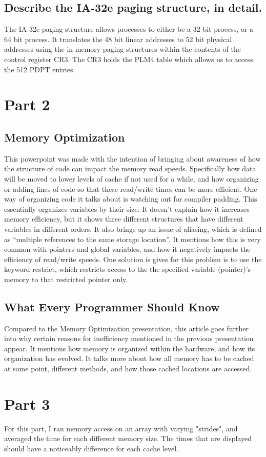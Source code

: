 \documentclass[onecolumn, draftclsnofoot,10pt, compsoc]{IEEEtran}
\begin{document}
\subsection{Describe the IA-32e paging structure, in detail.}
The IA-32e paging structure allows processes to either be a 32 bit process, or a 64 bit process. It translates the 48 bit linear addresses to 52 bit physical addresses using the in-memory paging structures within the contents of the control register CR3. The CR3 holds the PLM4 table which allows us to access the 512 PDPT entries.


\section{Part 2}
\subsection{Memory Optimization}
This powerpoint was made with the intention of bringing about awareness of how the structure of code can impact the memory read speeds. Specifically how data will be moved to lower levels of cache if not used for a while, and how organizing or adding lines of code so that these read/write times can be more efficient. One way of organizing code it talks about is watching out for compiler padding. This essentially organizes variables by their size. It doesn’t explain how it increases memory efficiency, but it shows three different structures that have different variables in different orders. It also brings up an issue of aliasing, which is defined as “multiple references to the same storage location”. It mentions how this is very common with pointers and global variables, and how it negatively impacts the efficiency of read/write speeds. One solution is gives for this problem is to use the keyword restrict, which restricts access to the the specified variable (pointer)’s memory to that restricted pointer only. 

\subsection{What Every Programmer Should Know}
Compared to the Memory Optimization presentation, this article goes further into why certain reasons for inefficiency mentioned in the previous presentation appear. It mentions how memory is organized within the hardware, and how its organization has evolved. It talks more about how all memory has to be cached at some point, different methods, and how those cached locations are accessed. 

\section{Part 3}
For this part, I ran memory access on an array with varying "strides", and averaged the time for each different memory size. The times that are displayed should have a noticeably difference for each cache level. 
\end{document}
